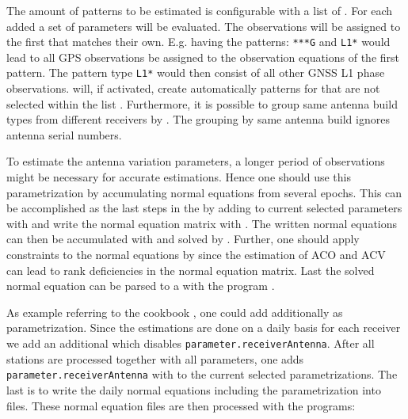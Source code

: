 The amount of patterns to be estimated is configurable with a list of .
For each added  a set of parameters will be evaluated. The observations
will be assigned to the first  that matches their own.
E.g. having the patterns: \verb|***G| and \verb|L1*| would lead to all GPS observations be assigned
to the observation equations of the first pattern. The pattern type \verb|L1*| would then consist
of all other GNSS L1 phase observations.  will, if activated, create automatically patterns
for  that are not selected within the list .
Furthermore, it is possible to group same antenna build types from different receivers by .
The grouping by same antenna build ignores antenna serial numbers.

To estimate the antenna variation parameters, a longer period of observations might be necessary
for accurate estimations. Hence one should use this parametrization by
accumulating normal equations from several epochs.
This can be accomplished as the last steps in the 
 by adding 
to current selected parameters with 
and write the normal equation matrix with .
The written normal equations can then be accumulated with  and solved by .
Further, one should apply constraints to the normal equations by  since the estimation
 of ACO and ACV can lead to rank deficiencies in the normal equation matrix.
Last the solved normal equation can be parsed to a 
 with the program .

As example referring to the cookbook ,
one could add additionally  as parametrization.
Since the estimations are done on a daily basis for each receiver we add an additional
 which
disables \verb|parameter.receiverAntenna|. After all stations are processed together with all parameters, one
adds \verb|parameter.receiverAntenna| with 
 to the current selected parametrizations.
The last  is 
to write the daily normal equations including the parametrization  into files.
These normal equation files are then processed with the programs:

